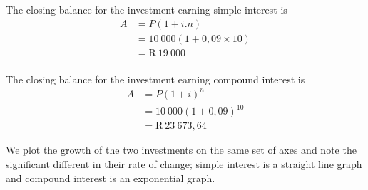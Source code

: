 The closing balance for the investment earning simple interest is
\begin{align*}
    A &= P(1 + i . n)\\
      &= 10~000(1 + 0,09 \times 10)\\
      &= \mbox{R}~19~000\\
\end{align*}

The closing balance for the investment earning compound interest is
\begin{align*}
    A &= P(1 + i)^n\\
      &= 10~000(1 + 0,09)^{10}\\
      &= \mbox{R}~23~673,64
\end{align*}

We plot the growth of the two investments on the same set of axes and note the significant different in their rate of change; simple interest is a straight line graph and compound interest is an exponential graph.

\begin{figure}[H]
    \begin{center}
      \\
	\label{FG:fig:SI10}
    \end{center}
\end{figure}


